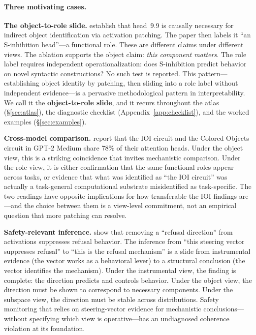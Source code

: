 \documentclass{article}
\begin{document}
\paragraph{Three motivating cases.}

\textbf{The object-to-role slide.}
\citet{wang2022} establish that head~9.9 is causally necessary for
indirect object identification via activation patching.  The paper then
labels it ``an S-inhibition head''---a functional role.  These are
different claims under different views.  The ablation supports the
object claim: \emph{this component matters}.  The role label requires
independent operationalization: does S-inhibition predict behavior on
novel syntactic constructions?  No such test is reported.  This
pattern---establishing object identity by patching, then sliding into a
role label without independent evidence---is a pervasive methodological
pattern in interpretability.
We call it the \textbf{object-to-role slide}, and it recurs throughout
the atlas (\S\ref{sec:atlas}), the diagnostic checklist
(Appendix~\ref{app:checklist}), and the worked examples
(\S\ref{sec:examples}).

\textbf{Cross-model comparison.}
\citet{merullo2024} report that the IOI circuit and the Colored Objects
circuit in GPT-2 Medium share 78\% of their attention heads.  Under the
object view, this is a striking coincidence that invites mechanistic
comparison.  Under the role view, it is either confirmation that the
same functional roles appear across tasks, or evidence that what was
identified as ``the IOI circuit'' was actually a task-general
computational substrate misidentified as task-specific.  The two
readings have opposite implications for how transferable the IOI
findings are---and the choice between them is a view-level commitment,
not an empirical question that more patching can resolve.

\textbf{Safety-relevant inference.}
\citet{arditi2024} show that removing a ``refusal direction'' from
activations suppresses refusal behavior.  The inference from ``this
steering vector suppresses refusal'' to ``this is the refusal
mechanism'' is a slide from instrumental evidence (the vector works as
a behavioral lever) to a structural conclusion (the vector identifies
the mechanism).  Under the instrumental view, the finding is complete:
the direction predicts and controls behavior.  Under the object view,
the direction must be shown to correspond to necessary components.
Under the subspace view, the direction must be stable across
distributions.  Safety monitoring that relies on steering-vector
evidence for mechanistic conclusions---without specifying which view
is operative---has an undiagnosed coherence violation at its
foundation.
\end{document}
